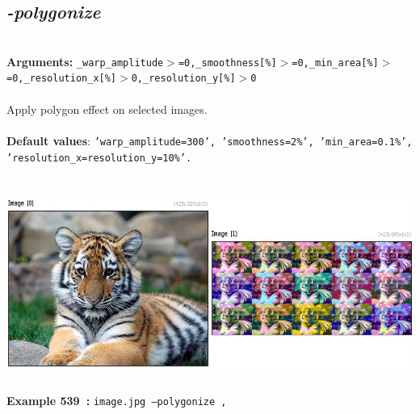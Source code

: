 \documentclass[a4paper,11pt,twoside]{book}
\begin{document}
\subsection{\emph{-polygonize} }\vspace*{-0.5em}
~\\\textbf{Arguments: } 
{\small \texttt{\_warp\_amplitude$>$=0,\_smoothness[\%]$>$=0,\_min\_area[\%]$>$=0,\_resolution\_x[\%]$>$0,\_resolution\_y[\%]$>$0}}\\~\\
Apply polygon effect on selected images.
~\\~\\\textbf{Default values}: {\small \texttt{'warp\_amplitude=300', 'smoothness=2\%', 'min\_area=0.1\%', 'resolution\_x=resolution\_y=10\%'.}}
\begin{center}\includegraphics[keepaspectratio=true,height=7cm,width=\textwidth]{img/gmic_def539.jpg}\\
{\footnotesize \textbf{Example 539~:} \texttt{image.jpg --polygonize ,}}
\end{center}
\end{document}
